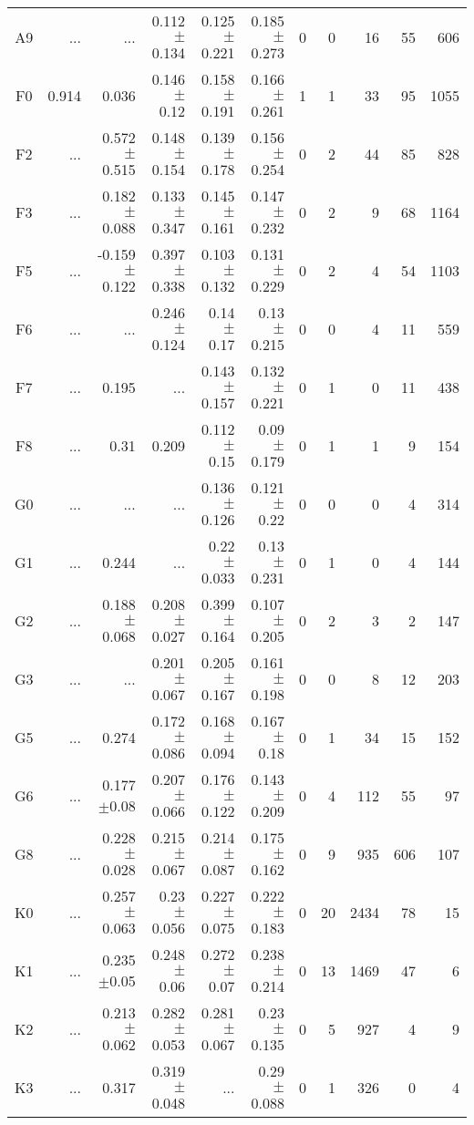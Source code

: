 \begin{table}[t]
\begin{table}[t]
\begin{center}
\begin{tabular}{c|rrrrr|rrrrr}
    A9	&	 ...	&	 ...	&	0.112$\pm$0.134	&	0.125$\pm$0.221	&	0.185$\pm$0.273	&	0	&	0	&	16	&	55	&	606	\\
    F0	&	0.914	&	0.036	&	0.146$\pm$0.12	&	0.158$\pm$0.191	&	0.166$\pm$0.261	&	1	&	1	&	33	&	95	&	1055	\\
    F2	&	 ...	&	0.572$\pm$0.515	&	0.148$\pm$0.154	&	0.139$\pm$0.178	&	0.156$\pm$0.254	&	0	&	2	&	44	&	85	&	828	\\
    F3	&	 ...	&	0.182$\pm$0.088	&	0.133$\pm$0.347	&	0.145$\pm$0.161	&	0.147$\pm$0.232	&	0	&	2	&	9	&	68	&	1164	\\
    F5	&	 ...	&	-0.159$\pm$0.122	&	0.397$\pm$0.338	&	0.103$\pm$0.132	&	0.131$\pm$0.229	&	0	&	2	&	4	&	54	&	1103	\\
    F6	&	 ...	&	 ...	&	0.246$\pm$0.124	&	0.14$\pm$0.17	&	0.13$\pm$0.215	&	0	&	0	&	4	&	11	&	559	\\
    F7	&	 ...	&	0.195	&	 ...	&	0.143$\pm$0.157	&	0.132$\pm$0.221	&	0	&	1	&	0	&	11	&	438	\\
    F8	&	 ...	&	0.31	&	0.209	&	0.112$\pm$0.15	&	0.09$\pm$0.179	&	0	&	1	&	1	&	9	&	154	\\
    G0	&	 ...	&	 ...	&	 ...	&	0.136$\pm$0.126	&	0.121$\pm$0.22	&	0	&	0	&	0	&	4	&	314	\\
    G1	&	 ...	&	0.244	&	 ...	&	0.22$\pm$0.033	&	0.13$\pm$0.231	&	0	&	1	&	0	&	4	&	144	\\
    G2	&	 ...	&	0.188$\pm$0.068	&	0.208$\pm$0.027	&	0.399$\pm$0.164	&	0.107$\pm$0.205	&	0	&	2	&	3	&	2	&	147	\\
    G3	&	 ...	&	 ...	&	0.201$\pm$0.067	&	0.205$\pm$0.167	&	0.161$\pm$0.198	&	0	&	0	&	8	&	12	&	203	\\
    G5	&	 ...	&	0.274	&	0.172$\pm$0.086	&	0.168$\pm$0.094	&	0.167$\pm$0.18	&	0	&	1	&	34	&	15	&	152	\\
    G6	&	 ...	&	0.177$\pm$0.08	&	0.207$\pm$0.066	&	0.176$\pm$0.122	&	0.143$\pm$0.209	&	0	&	4	&	112	&	55	&	97	\\
    G8	&	 ...	&	0.228$\pm$0.028	&	0.215$\pm$0.067	&	0.214$\pm$0.087	&	0.175$\pm$0.162	&	0	&	9	&	935	&	606	&	107	\\
    K0	&	 ...	&	0.257$\pm$0.063	&	0.23$\pm$0.056	&	0.227$\pm$0.075	&	0.222$\pm$0.183	&	0	&	20	&	2434	&	78	&	15	\\
    K1	&	 ...	&	0.235$\pm$0.05	&	0.248$\pm$0.06	&	0.272$\pm$0.07	&	0.238$\pm$0.214	&	0	&	13	&	1469	&	47	&	6	\\
    K2	&	 ...	&	0.213$\pm$0.062	&	0.282$\pm$0.053	&	0.281$\pm$0.067	&	0.23$\pm$0.135	&	0	&	5	&	927	&	4	&	9	\\
    K3	&	 ...	&	0.317	&	0.319$\pm$0.048	&	 ...	&	0.29$\pm$0.088	&	0	&	1	&	326	&	0	&	4	\\

\end{tabular}
\end{center}
\end{table}
\end{table}
